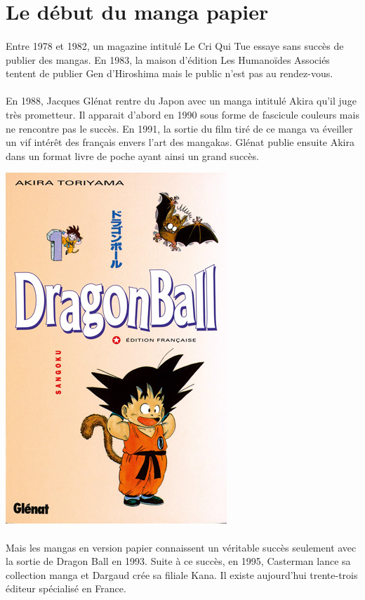 \section{Le début du manga papier}
\paragraph{}
Entre 1978 et 1982, un magazine intitulé Le Cri Qui Tue essaye sans succès de publier des mangas. En 1983, la maison d’édition Les Humanoïdes Associés tentent de publier Gen d’Hiroshima mais le public n’est pas au rendez-vous. 
\paragraph{}
En 1988, Jacques Glénat rentre du Japon avec un manga intitulé Akira qu’il juge très prometteur. Il apparait d’abord en 1990 sous forme de fascicule couleurs mais ne rencontre pas le succès. En 1991, la sortie du film tiré de ce manga va éveiller un vif intérêt des français envers l’art des mangakas. Glénat publie ensuite Akira dans un format livre de poche ayant ainsi un grand succès. 
\begin{center}
\includegraphics[scale=0.3]{dragonball.jpg}
\end{center}
\paragraph{}
Mais les mangas en version papier connaissent un véritable succès seulement avec la sortie de Dragon Ball en 1993. Suite à ce succès, en 1995, Casterman lance sa collection manga et Dargaud crée sa filiale Kana.  Il existe 	aujourd’hui trente-trois éditeur spécialisé en France.

